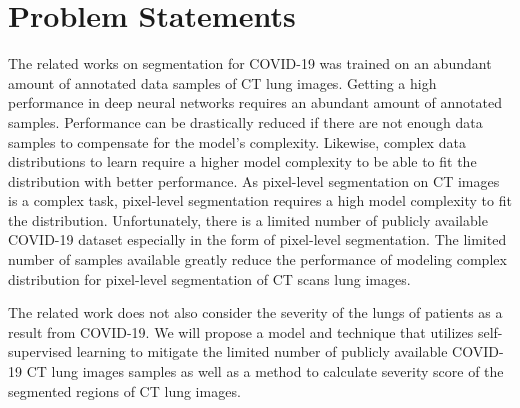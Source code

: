 \section{Problem Statements}
The related works on segmentation for COVID-19 was trained on an abundant amount of annotated data samples of CT lung images. Getting a high performance in deep neural networks requires an abundant amount of annotated samples. Performance can be drastically reduced if there are not enough data samples to compensate for the model’s complexity. Likewise, complex data distributions to learn require a higher model complexity to be able to fit the distribution with better performance. As pixel-level segmentation on CT images is a complex task, pixel-level segmentation requires a high model complexity to fit the distribution. Unfortunately, there is a limited number of publicly available COVID-19 dataset especially in the form of pixel-level segmentation. The limited number of samples available greatly reduce the performance of modeling complex distribution for pixel-level segmentation of CT scans lung images.

The related work does not also consider the severity of the lungs of patients as a result from COVID-19. We will propose a model and technique that utilizes self-supervised learning to mitigate the limited number of publicly available COVID-19 CT lung images samples as well as a method to calculate severity score of the segmented regions of CT lung images. 
